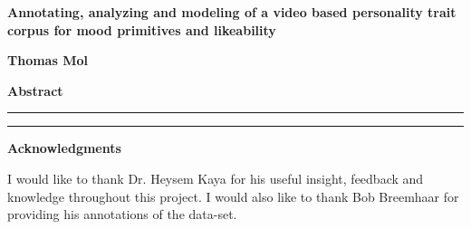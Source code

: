 \thispagestyle{plain}
\begin{center}
    \Large
    \textsf{
        \textbf{
            Annotating, analyzing and modeling of a video based personality trait corpus for mood primitives and likeability
        }
    }
    
    \large
    \vspace{0.4cm}
    \textbf{Thomas Mol}
   
    \vspace{0.9cm}
    \Large
    \textsf{\textbf{Abstract}}
\end{center}

\hrule
\vspace{6pt}

\vspace{6pt}
\hrule

\vfill

\begin{center}
    \Large
    \textsf{
        \textbf{Acknowledgments}
    }
\end{center}
I would like to thank Dr. Heysem Kaya for his useful insight, feedback and knowledge throughout this project. I would also like to thank Bob Breemhaar for providing his annotations of the data-set.
